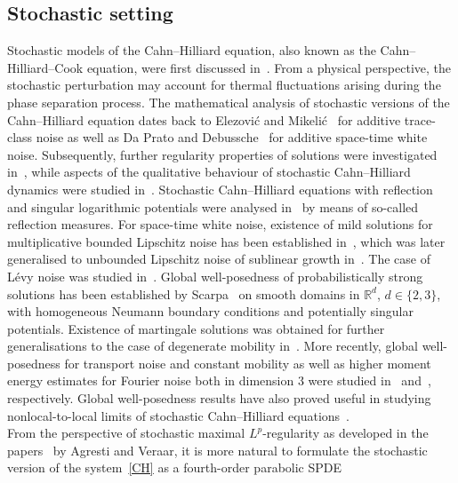 \documentclass[reqno]{amsart}
\newcommand{\R}{\mathbb{R}}
\newcommand{\1}{\mathbf{1}}
\begin{document}
\subsection{Stochastic setting}
\label{subsec:introStochasticLiterature}
Stochastic models of the Cahn--Hilliard equation, also known as the Cahn--Hilliard--Cook equation, were first discussed in~\cite{Cook1970}. From a physical perspective, the stochastic perturbation may account for thermal fluctuations arising during the phase separation process. The mathematical analysis of stochastic versions of the Cahn--Hilliard equation dates back to Elezovi\'c and Mikeli\'c~\cite{Elezovic91} for additive trace-class noise as well as Da Prato and Debussche~\cite{DaPratoDebusche1996} for additive space-time white noise. 
Subsequently, further regularity properties of solutions were investigated in~\cite{Cardon-Weber2001,Cardon-Weber2002}, while aspects of the qualitative behaviour of stochastic Cahn--Hilliard dynamics were studied in~\cite{Bloemker2001,Bloemker2008}.
Stochastic Cahn--Hilliard equations with reflection and singular logarithmic potentials were analysed in~\cite{Debusche2007,Goudenege2009,Debusche2011} by means of so-called reflection measures. For space-time white noise, existence of mild solutions for multiplicative bounded Lipschitz noise has been established in~\cite{AntonopoulouKarali}, which was later generalised to unbounded Lipschitz noise of sublinear growth in~\cite{AnatonopoulouKaraliMillet16}. The case of Lévy noise was studied in~\cite{Bo2006}. 
Global well-posedness of probabilistically strong solutions has been established by Scarpa~\cite{Scarpa2018} on smooth domains in $\R^d$, $d\in \{2,3\}$, with homogeneous Neumann boundary conditions and potentially singular potentials. Existence of martingale solutions was obtained for further generalisations to the case of degenerate mobility in~\cite{Scarpa2021b}. More recently, global well-posedness for transport noise and constant mobility as well as higher moment energy estimates for Fourier noise both in dimension $3$ were studied in~\cite{diPrimioPapiniScarpa26} and~\cite{Antonopoulou23}, respectively.
Global well-posedness results have also proved useful in studying nonlocal-to-local limits of stochastic Cahn--Hilliard equations~\cite{diprimioStochasticNonlocalCahn2026}.\\
From the perspective of stochastic maximal $L^p$-regularity as developed in the papers~\cite{agrestiNonlinearParabolicStochastic2022,agrestiNonlinearParabolicStochastic2022a} by Agresti and Veraar, it is more natural to formulate the stochastic version of the system~\eqref{CH} as a fourth-order parabolic SPDE
\end{document}
